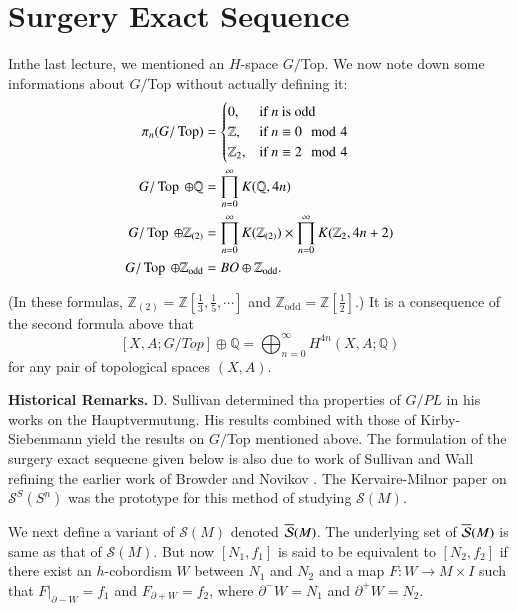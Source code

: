 \chapter{Surgery Exact Sequence}\label{c5}

In\pageoriginale the last lecture, we mentioned an $H$-space
$G/$Top. We now note down some informations about $G/$Top without
actually defining it:
\begin{align*}
  \pi_n (G/\operatorname{Top}) & = 
  \begin{cases}
    0, & \text{if}~ n ~\text{is odd}\\
    \mathbb{Z}, & \text{if}~ n \equiv 0 \mod 4\\
    \mathbb{Z}_2, & \text{if}~ n \equiv 2 \mod 4
  \end{cases}\\
  G/\operatorname{Top}~ \oplus \mathbb{Q} & = \prod_{n=0}^\infty K
  (\mathbb{Q}, 4n)\\
  G/\operatorname{Top}~ \oplus \mathbb{Z}_{(2)} & = \prod_{n=0}^\infty
  K(\mathbb{Z}_{(2)}) \times \prod_{n=0}^\infty K(\mathbb{Z}_2, 4 n
  +2)\\
  G/\operatorname{Top}~ \oplus \mathbb{Z}_{\text{odd}} & = BO \oplus
  \mathbb{Z}_{\text{odd}}.
\end{align*}

(In these formulas, $\mathbb{Z}_{(2)}= \mathbb{Z} \left[\frac{1}{3},
  \frac{1}{5}, \cdots \right]$ and  $\mathbb{Z}_{\text{odd}} =
\mathbb{Z} \left[\frac{1}{2} \right]$.) It is a consequence of the
second formula above that
$$
[X, A; G/Top] \oplus \mathbb{Q}= \bigoplus_{n=0}^{\infty} H^{4n} (X, A
; \mathbb{Q})
$$
for any pair of topological spaces $(X, A)$.


\noindent \textbf{Historical Remarks.} D. Sullivan \cite{93}
determined tha properties of $G/PL$ in his works on the
Hauptvermutung. His results combined with those of Kirby-Siebenmann
\cite{67} yield the results on $G/$Top mentioned above. The
formulation of the surgery exact sequecne given below is also due to
work of Sullivan and Wall refining the earlier work of Browder
\cite{12} and Novikov \cite{77}. The Kervaire-Milnor paper \cite{65}
on $\mathcal{S}^S(S^n)$ was the prototype for this method of studying
$\mathcal{S}(M)$.  

\begin{defi}\label{c5:defi5.1}
  We next define a variant of $\mathcal{S}(M)$ denoted
  $\overline{\mathcal{S}}(M)$. The 
  underlying set of $\overline{\mathcal{S}}(M)$ is same as that of
  $\mathcal{S}(M)$. But now 
  $[N_1, f_1]$ is said to be equivalent to $[N_2, f_2]$ if there exist
  an $h$-cobordism $W$ between $N_1$ and $N_2$ and a map $F:W \to M
  \times I$ such that $F|_{\partial -W}= f_1$ and $F_{\partial +W} =
  f_2$, where $\partial^- W = N_1$ and $\partial^+ W = N_2$.
\end{defi}

